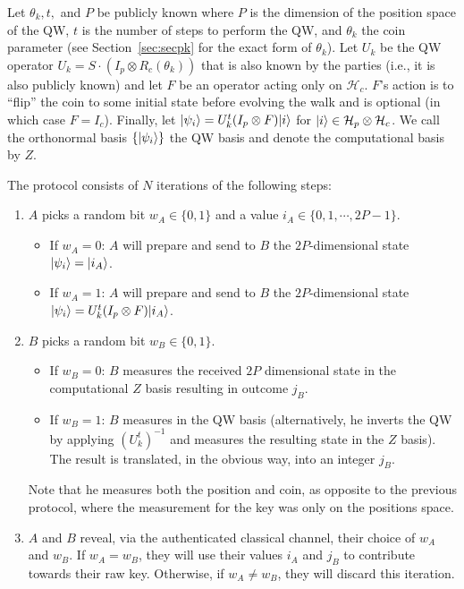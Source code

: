 \begin{protocol}
\label{alg:prot1}
Let $\theta_k, t,$ and $P$ be publicly known where $P$ is the dimension of the position space of the QW, $t$ is the number of steps to perform the QW, and $\theta_k$ the coin parameter (see Section~\ref{sec:secpk} for the exact form of $\theta_k$).  Let $U_k$ be the QW operator $U_k = S\cdot (I_p\otimes R_c(\theta_k))$ that is also known by the parties (i.e., it is also publicly known) and let $F$ be an operator acting only on $\mathcal{H}_c$. $F$'s action is to ``flip'' the coin to some initial state before evolving the walk and is optional (in which case $F=I_c$). Finally, let $| \psi_i \rangle = U_k^t(I_p\otimes F)| i \rangle$ for $| i \rangle \in \mathcal{H}_p\otimes\mathcal{H}_c$.  We call the orthonormal basis $\{| \psi_i \rangle\}$ the QW basis and denote the computational basis by $Z$.


The protocol consists of $N$ iterations of the following steps:
\begin{enumerate}
  \item $A$ picks a random bit $w_A \in \{0,1\}$ and a value $i_A \in \{0,1, \cdots, 2P-1\}$.
    \begin{itemize}
    \item If $w_A = 0$: $A$ will prepare and send to $B$ the $2P$-dimensional state $| \psi_i \rangle = | i_A \rangle$.
    \item If $w_A = 1$: $A$ will prepare and send to $B$ the $2P$-dimensional state $| \psi_i \rangle = U_k^t(I_p\otimes F)| i_A \rangle$.
    \end{itemize}

  \item $B$ picks a random bit $w_B \in \{0,1\}$.
    \begin{itemize}
    \item If $w_B = 0$: $B$ measures the received $2P$ dimensional state in the computational $Z$ basis resulting in outcome $j_B$.
    \item If $w_B = 1$: $B$ measures in the QW basis (alternatively, he inverts the QW by applying $\left(U_k^t\right)^{-1}$ and measures the resulting state in the $Z$ basis).  The result is translated, in the obvious way, into an integer $j_B$.
    \end{itemize}
Note that he measures both the position and coin, as opposite to the previous protocol, where the measurement for the key was only on the positions space.
  \item $A$ and $B$ reveal, via the authenticated classical channel, their choice of $w_A$ and $w_B$.  If $w_A = w_B$, they will use their values $i_A$ and $j_B$ to contribute towards their raw key.  Otherwise, if $w_A \ne w_B$, they will discard this iteration.
\end{enumerate}


\end{protocol}
